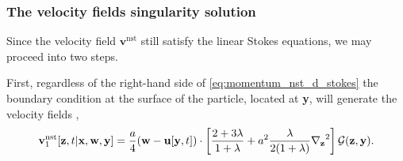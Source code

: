 \subsubsection{The velocity fields singularity solution}

Since the velocity field $\textbf{v}^\text{nst}$ still satisfy the linear Stokes equations, we may proceed into two steps. 

First, regardless of the right-hand side of \ref{eq:momentum_nst_d_stokes} the boundary condition at the surface of the particle, located at \textbf{y}, will generate the velocity fields \citep{pozrikidis1992boundary}, 
\begin{equation}
    \textbf{v}^\text{nst}_1[\textbf{z},t|\textbf{x},\textbf{w},\textbf{y}]
    = 
    \frac{a}{4}(\textbf{w}- \textbf{u}[\textbf{y},t])\cdot\left[
        \frac{2+3\lambda}{1+\lambda}
        +
        a^2\frac{\lambda}{2(1+\lambda)}\pddz^2 
    \right]\mathcal{G}(\textbf{z},\textbf{y}).
    \label{eq:solution_isolated2}
\end{equation}

